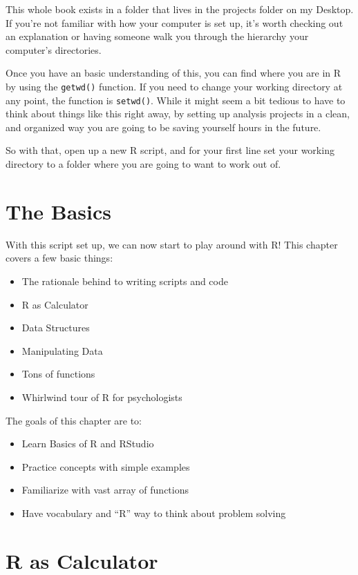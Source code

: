 \documentclass[]{book}
\providecommand{\tightlist}{%
  \setlength{\itemsep}{0pt}\setlength{\parskip}{0pt}}
\theoremstyle{definition}
\theoremstyle{definition}
\theoremstyle{definition}
\theoremstyle{remark}
\begin{document}
This whole book exists in a folder that lives in the projects folder on
my Desktop. If you're not familiar with how your computer is set up,
it's worth checking out an explanation or having someone walk you
through the hierarchy your computer's directories.

Once you have an basic understanding of this, you can find where you are
in R by using the \texttt{getwd()} function. If you need to change your
working directory at any point, the function is \texttt{setwd()}. While
it might seem a bit tedious to have to think about things like this
right away, by setting up analysis projects in a clean, and organized
way you are going to be saving yourself hours in the future.

So with that, open up a new R script, and for your first line set your
working directory to a folder where you are going to want to work out
of.

\section{The Basics}\label{the-basics}

With this script set up, we can now start to play around with R! This
chapter covers a few basic things:

\begin{itemize}
\tightlist
\item
  The rationale behind to writing scripts and code
\item
  R as Calculator
\item
  Data Structures
\item
  Manipulating Data
\item
  Tons of functions
\item
  Whirlwind tour of R for psychologists
\end{itemize}

The goals of this chapter are to:

\begin{itemize}
\tightlist
\item
  Learn Basics of R and RStudio
\item
  Practice concepts with simple examples
\item
  Familiarize with vast array of functions
\item
  Have vocabulary and ``R'' way to think about problem solving
\end{itemize}

\section{R as Calculator}\label{r-as-calculator}
\end{document}
